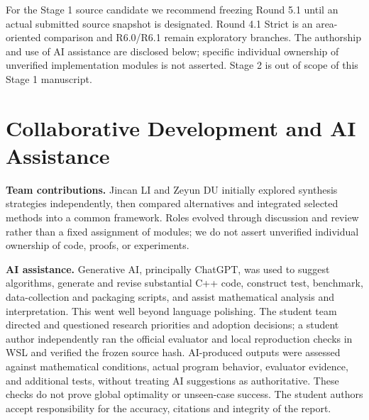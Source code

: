 \documentclass[journal,10pt]{IEEEtran}
\begin{document}
For the Stage 1 source candidate we recommend freezing Round 5.1 until an actual submitted source snapshot is designated. Round 4.1 Strict is an area-oriented comparison and R6.0/R6.1 remain exploratory branches. The authorship and use of AI assistance are disclosed below; specific individual ownership of unverified implementation modules is not asserted. Stage 2 is out of scope of this Stage 1 manuscript.


\section{Collaborative Development and AI Assistance}
\label{sec:disclosure}
\textbf{Team contributions.} Jincan LI and Zeyun DU initially explored synthesis strategies independently, then compared alternatives and integrated selected methods into a common framework. Roles evolved through discussion and review rather than a fixed assignment of modules; we do not assert unverified individual ownership of code, proofs, or experiments.

\textbf{AI assistance.} Generative AI, principally ChatGPT, was used to suggest algorithms, generate and revise substantial C++ code, construct test, benchmark, data-collection and packaging scripts, and assist mathematical analysis and interpretation. This went well beyond language polishing. The student team directed and questioned research priorities and adoption decisions; a student author independently ran the official evaluator and local reproduction checks in WSL and verified the frozen source hash. AI-produced outputs were assessed against mathematical conditions, actual program behavior, evaluator evidence, and additional tests, without treating AI suggestions as authoritative. These checks do not prove global optimality or unseen-case success. The student authors accept responsibility for the accuracy, citations and integrity of the report.

\clearpage
\onecolumn
\appendices
\end{document}
